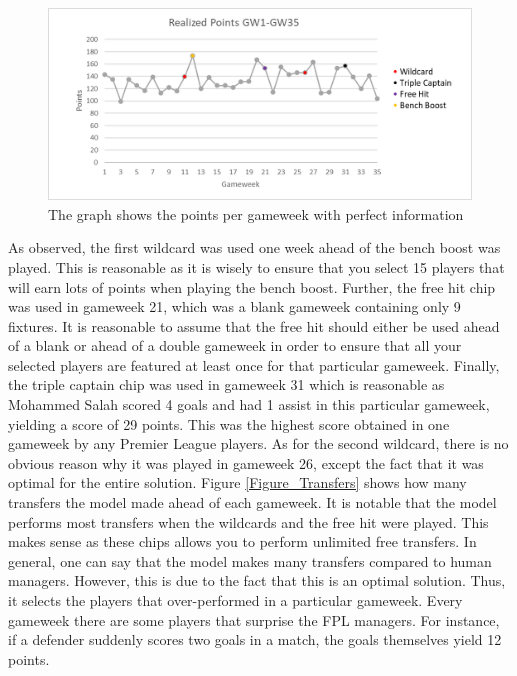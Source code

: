 \begin{figure}[H]
\label{fig:Realized_points}
    \centering
    \includegraphics[scale=0.75]{fig/chapter_7/RealizedPoints_colour.png}
    \caption{The graph shows the points per gameweek with perfect information}
\label{Figure_Realized_points}    
\end{figure}

 As observed, the first wildcard was used one week ahead of the bench boost was played. This is reasonable as it is wisely to ensure that you select 15 players that will earn lots of points when playing the bench boost. Further, the free hit chip was used in gameweek 21, which was a blank gameweek containing only 9 fixtures. It is reasonable to assume that the free hit should either be used ahead of a blank or ahead of a double gameweek in order to ensure that all your selected players are featured at least once for that particular gameweek. Finally, the triple captain chip was used in gameweek 31 which is reasonable as Mohammed Salah scored 4 goals and had 1 assist in this particular gameweek, yielding a score of 29 points. This was the highest score obtained in one gameweek by any Premier League players. As for the second wildcard, there is no obvious reason why it was played in gameweek 26, except the fact that it was optimal for the entire solution. 
\newpar
Figure \ref{Figure_Transfers} shows how many transfers the model made ahead of each gameweek. It is notable that the model performs most transfers when the wildcards and the free hit were played. This makes sense as these chips allows you to perform unlimited free transfers. In general, one can say that the model makes many transfers compared to human managers. However, this is due to the fact that this is an optimal solution. Thus, it selects the players that over-performed in a particular gameweek. Every gameweek there are some players that surprise the FPL managers. For instance, if a defender suddenly scores two goals in a match, the goals themselves yield 12 points. 

